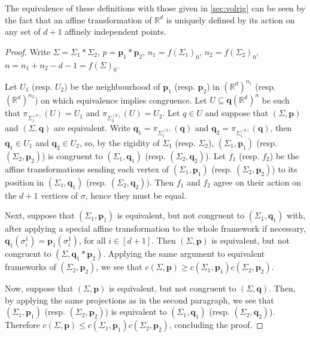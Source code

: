 \documentclass[11pt]{amsart}
\theoremstyle{definition}
\theoremstyle{remark}
\begin{document}
The equivalence of these definitions with those given in \cref{sec:volrig} can be seen by the fact that an affine transformation of $\mathbb{R}^d$ is uniquely defined by its action on any set of $d+1$ affinely independent points.

\begin{proof}
    Write $\Sigma=\Sigma_1*\Sigma_2$, $p=\mathbf{p}_1*\mathbf{p}_2$, $n_1 = f(\Sigma_1)_0$, $n_2=f(\Sigma_2)_0$, $n=n_1+n_2-d-1=f(\Sigma)_0$.
    
    Let $U_1$ (resp. $U_2$) be the neighbourhood of $\mathbf{p}_1$ (resp. $\mathbf{p}_2$) in $(\mathbb{R}^d)^{n_1}$ (resp. $(\mathbb{R}^d)^{n_2}$) on which equivalence implies congruence.
    Let $U\subseteq\mathbf{q}(\mathbb{R}^d)^n$ be such that $\pi_{\Sigma_1^{(0)}}(U)=U_1$ and $\pi_{\Sigma_2^{(0)}}(U)=U_2$.
    Let $q\in U$ and suppose that $(\Sigma,\mathbf{p})$ and $(\Sigma,\mathbf{q})$ are equivalent.
    Write $\mathbf{q}_1=\pi_{\Sigma_1^{(0)}}(\mathbf{q})$ and $\mathbf{q}_2=\pi_{\Sigma_1^{(0)}}(\mathbf{q})$, then $\mathbf{q}_1\in U_1$ and $\mathbf{q}_2\in U_2$, so, by the rigidity of $\Sigma_1$ (resp. $\Sigma_2$), $(\Sigma_1,\mathbf{p}_1)$ (resp. $(\Sigma_2,\mathbf{p}_2)$) is congruent to $(\Sigma_1,\mathbf{q}_1)$ (resp. $(\Sigma_2,\mathbf{q}_2)$).
    Let $f_1$ (resp. $f_2$) be the affine transformations sending each vertex of $(\Sigma_1,\mathbf{p}_1)$ (resp. $(\Sigma_2,\mathbf{p}_2)$) to its position in $(\Sigma_1,\mathbf{q}_1)$ (resp. $(\Sigma_2,\mathbf{q}_2)$).
    Then $f_1$ and $f_2$ agree on their action on the $d+1$ vertices of $\sigma$, hence they must be equal.

    Next, suppose that $(\Sigma_1,\mathbf{p}_1)$ is equivalent, but not congruent to $(\Sigma_1,\mathbf{q}_1)$ with, after applying a special affine transformation to the whole framework if necessary, $\mathbf{q}_1(\sigma_i^1)=\mathbf{p}_1(\sigma_i^1)$, for all $i\in [d+1]$.
    Then $(\Sigma,\mathbf{p})$ is equivalent, but not congruent to $(\Sigma,\mathbf{q}_1*\mathbf{p}_2)$.
    Applying the same argument to equivalent frameworks of $(\Sigma_2,\mathbf{p}_2)$, we see that $c(\Sigma,\mathbf{p})\geq c(\Sigma_1,\mathbf{p}_1)c(\Sigma_2,\mathbf{p}_2)$.

    Now, suppose that $(\Sigma,\mathbf{p})$ is equivalent, but not congruent to $(\Sigma,\mathbf{q})$.
    Then, by applying the same projections as in the second paragraph, we see that $(\Sigma_1,\mathbf{p}_1)$ (resp. $(\Sigma_2,\mathbf{p}_2)$) is equivalent to $(\Sigma_1,\mathbf{q}_1)$ (resp. $(\Sigma_2,\mathbf{q}_2)$).
    Therefore $c(\Sigma,\mathbf{p})\leq c(\Sigma_1,\mathbf{p}_1)c(\Sigma_2,\mathbf{p}_2)$, concluding the proof.
\end{proof}
\end{document}
